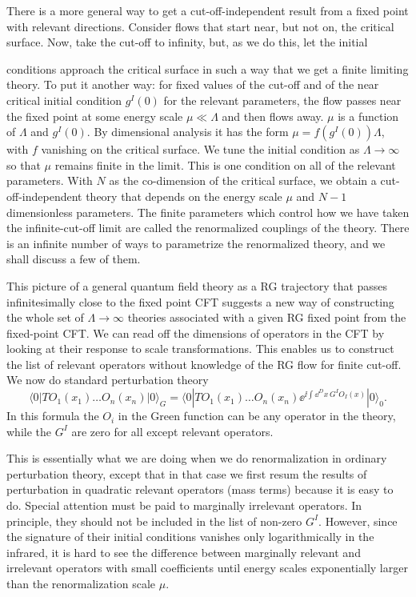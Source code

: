 There is a more general way to get a cut-off-independent result from a fixed point
with relevant directions. Consider flows that start near, but not on, the critical
surface. Now, take the cut-off to infinity, but, as we do this, let the initial

conditions approach the critical surface in such a way that we get a finite limiting
theory. To put it another way: for fixed values of the cut-off and of the near
critical initial condition $g^{I}(0)$ for the relevant parameters, the flow passes
near the fixed point at some energy scale $\mu\ll\Lambda$ and then flows away.
$\mu$ is a function of $\Lambda$ and $g^{I}(0)$. By dimensional analysis it has
the form $\mu=f(g^{I}(0))\Lambda$, with $f$ vanishing on the critical surface. We
tune the initial condition as $\Lambda\to\infty$ so that $\mu$ remains finite in
the limit. This is one condition on all of the relevant parameters. With $N$ as
the co-dimension of the critical surface, we obtain a cut-off-independent theory
that depends on the energy scale $\mu$ and $N-1$ dimensionless parameters. The
finite parameters which control how we have taken the infinite-cut-off limit are
called the renormalized couplings of the theory. There is an infinite number of
ways to parametrize the renormalized theory, and we shall discuss a few of them.

This picture of a general quantum field theory as a RG trajectory that passes
infinitesimally close to the fixed point CFT suggests a new way of constructing the
whole set of $\Lambda\to\infty$ theories associated with a given RG fixed point
from the fixed-point CFT. We can read off the dimensions of operators in the CFT
by looking at their response to scale transformations. This enables us to construct
the list of relevant operators without knowledge of the RG flow for finite cut-off.
We now do standard perturbation theory
\[
 \langle0|T O_{1}(x_{1})\ldots O_{n}(x_{n})|0\rangle_{G}
 =\langle0|T O_{1}(x_{1})\ldots O_{n}(x_{n})
   \ee^{\ii\int\dd^{D}x\,G^{I}O_{I}(x)}|0\rangle_{0}.
\]
In this formula the $O_i$ in the Green function can be any operator in the
theory, while the $G^I$ are zero for all except relevant operators.

This is essentially what we are doing when we do renormalization in ordinary
perturbation theory, except that in that case we first resum the results of
perturbation in quadratic relevant operators (mass terms) because it is easy to
do. Special attention must be paid to marginally irrelevant operators. In
principle, they should not be included in the list of non-zero $G^I$. However,
since the signature of their initial conditions vanishes only logarithmically in
the infrared, it is hard to see the difference between marginally relevant and
irrelevant operators with small coefficients until energy scales exponentially
larger than the renormalization scale $\mu$.


